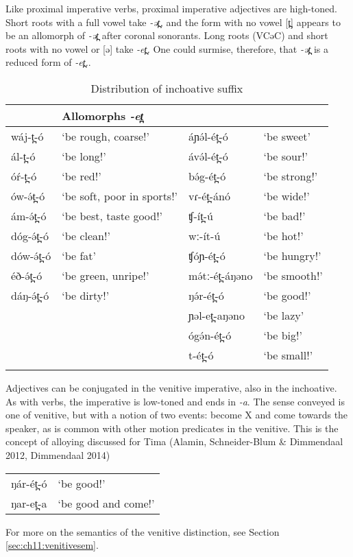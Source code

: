 
Like proximal imperative verbs, proximal imperative adjectives are high-toned. Short roots with a full vowel take \textit{-ət̪,} and the form with no vowel [t̪] appears to be an allomorph of \textit{-ət̪ } after coronal sonorants. Long roots (VCəC) and short roots with no vowel or [ə] take \textit{-et̪.} One could surmise, therefore, that \textit{-ət̪ } is a reduced form of \textit{-et̪.}. %

\begin{table}
	\caption{Distribution of inchoative suffix}
\begin{tabular}[t]{llll}
\lsptoprule
\multicolumn{2}{c}{Allomorphs \textit{-t̪} and \textit{-ət̪}} & Allomorphs \textit{-et̪}\\
\midrule
wáj-t̪-ó  	& ‘be rough, coarse!’ & áɲə́l-ét̪-ó 	& ‘be sweet’\\
ál-t̪-ó  	& ‘be long!’ & ávə́l-ét̪-ó	& ‘be sour!’\\
óŕ-t̪-ó  	& ‘be red!’ & bə́g-ét̪-ó 	& ‘be strong!’\\
ów-ə́t̪-ó  	& ‘be soft, poor in sports!’ & vɾ-ét̪-ánó 	& ‘be wide!’\\
ám-ə́t̪-ó  	& ‘be best, taste good!’ & ʧ-ít̪-ú	 	& ‘be bad!’\\
dóg-ə́t̪-ó  	& ‘be clean!’ & wː-ít-ú 	& ‘be hot!’\\
dów-ə́t̪-ó 	& ‘be fat’ & ʧóɲ-ét̪-ó 	& ‘be hungry!’\\
éð-ə́t̪-ó 	& ‘be green, unripe!’ & mə́tː-ét̪-áŋəno & ‘be smooth!’\\
dáŋ-ə́t̪-ó 	& ‘be dirty!’ & ŋə́r-ét̪-ó	 & ‘be good!’\\
& & ɲəl-et̪-aŋəno & ‘be lazy’\\
& & ógə́n-ét̪-ó 	& ‘be big!’\\
& & t-ét̪-ó 		& ‘be small!’\\
\lspbottomrule
\end{tabular} 
\end{table}

Adjectives can be conjugated in the venitive imperative, also in the inchoative. As with verbs, the imperative is low-toned and ends in \textit{-a}. The sense conveyed is one of venitive, but with a notion of two events: become X and come towards the speaker, as is common with other motion predicates in the venitive. This is the concept of alloying discussed for Tima (Alamin, Schneider-Blum \& Dimmendaal 2012, Dimmendaal 2014) %
\ea  
\begin{tabular}[t]{ll}
ŋár-ét̪-ó	& 	‘be good!’		\\
ŋar-et̪-a	&	‘be good and come!’ \\
\end{tabular}
\z
For more on the semantics of the venitive distinction, see Section \ref{sec:ch11:venitivesem}.

